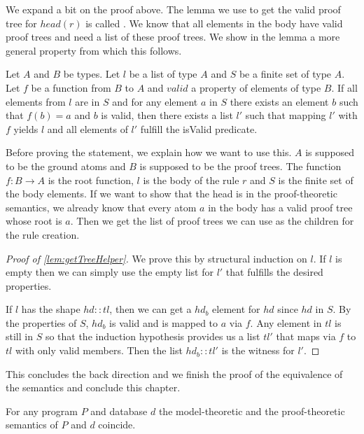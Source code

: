 We expand a bit on the proof above. The lemma we use to get the valid proof tree for $head(r)$ is called \createProofTreeForRule. We know that all elements in the body have valid proof trees and need a list of these proof trees. We show in the lemma \getTreeHelper a more general property from which this follows.

\begin{lemma}[\getTreeHelper]\label{lem:getTreeHelper}
    Let $A$ and $B$ be types. Let $l$ be a list of type $A$ and $S$ be a finite set of type $A$. Let $f$ be a function from $B$ to $A$ and $valid$ a property of elements of type $B$. If all elements from $l$ are in $S$ and for any element $a$ in $S$ there exists an element $b$ such that $f(b) = a $ and $b$ is valid, then there exists a list $l'$ such that mapping $l'$ with $f$ yields $l$ and all elements of $l'$ fulfill the isValid predicate.
\end{lemma}

Before proving the statement, we explain how we want to use this. $A$ is supposed to be the ground atoms and $B$ is supposed to be the proof trees. The function $f: B \to A$ is the root function, $l$ is the body of the rule $r$ and $S$ is the finite set of the body elements. If we want to show that the head is in the proof-theoretic semantics, we already know that every atom $a$ in the body has a valid proof tree whose root is $a$. Then we get the list of proof trees we can use as the children for the rule creation.

\begin{proof}[Proof of \cref{lem:getTreeHelper}]
    We prove this by structural induction on $l$. If $l$ is empty then we can simply use the empty list for $l'$ that fulfills the desired properties.

    If $l$ has the shape $hd::tl$, then we can get a $hd_b$ element for $hd$ since $hd$ in $S$. By the properties of $S$, $hd_b$ is valid and is mapped to $a$ via $f$. Any element in $tl$ is still in $S$ so that the induction hypothesis provides us a list $tl'$ that maps via $f$ to $tl$ with only valid members. Then the list $hd_b::tl'$ is the witness for $l'$.
\end{proof}

This concludes the back direction and we finish the proof of the equivalence of the semantics and conclude this chapter.

\begin{theorem}[\SemanticsEquivalence]\label{trm:semanticsEquiv}
    For any program $P$ and database $d$ the model-theoretic and the proof-theoretic semantics of $P$ and $d$ coincide.
\end{theorem}
